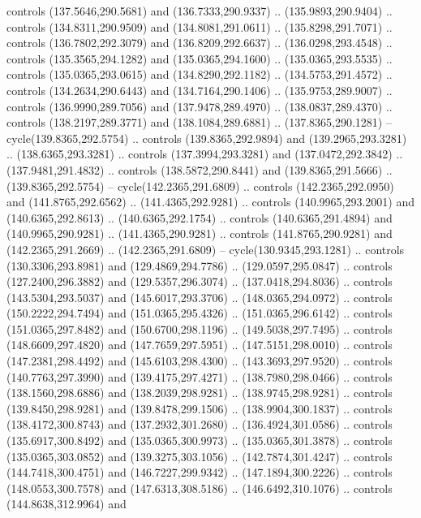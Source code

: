 \begin{scope}[cm={{1.25,0.0,0.0,-1.25,(0.0,743.43331)}}]
    controls (137.5646,290.5681) and (136.7333,290.9337) .. (135.9893,290.9404) ..
    controls (134.8311,290.9509) and (134.8081,291.0611) .. (135.8298,291.7071) ..
    controls (136.7802,292.3079) and (136.8209,292.6637) .. (136.0298,293.4548) ..
    controls (135.3565,294.1282) and (135.0365,294.1600) .. (135.0365,293.5535) ..
    controls (135.0365,293.0615) and (134.8290,292.1182) .. (134.5753,291.4572) ..
    controls (134.2634,290.6443) and (134.7164,290.1406) .. (135.9753,289.9007) ..
    controls (136.9990,289.7056) and (137.9478,289.4970) .. (138.0837,289.4370) ..
    controls (138.2197,289.3771) and (138.1084,289.6881) .. (137.8365,290.1281) --
    cycle(139.8365,292.5754) .. controls (139.8365,292.9894) and
    (139.2965,293.3281) .. (138.6365,293.3281) .. controls (137.3994,293.3281) and
    (137.0472,292.3842) .. (137.9481,291.4832) .. controls (138.5872,290.8441) and
    (139.8365,291.5666) .. (139.8365,292.5754) -- cycle(142.2365,291.6809) ..
    controls (142.2365,292.0950) and (141.8765,292.6562) .. (141.4365,292.9281) ..
    controls (140.9965,293.2001) and (140.6365,292.8613) .. (140.6365,292.1754) ..
    controls (140.6365,291.4894) and (140.9965,290.9281) .. (141.4365,290.9281) ..
    controls (141.8765,290.9281) and (142.2365,291.2669) .. (142.2365,291.6809) --
    cycle(130.9345,293.1281) .. controls (130.3306,293.8981) and
    (129.4869,294.7786) .. (129.0597,295.0847) .. controls (127.2400,296.3882) and
    (129.5357,296.3074) .. (137.0418,294.8036) .. controls (143.5304,293.5037) and
    (145.6017,293.3706) .. (148.0365,294.0972) .. controls (150.2222,294.7494) and
    (151.0365,295.4326) .. (151.0365,296.6142) .. controls (151.0365,297.8482) and
    (150.6700,298.1196) .. (149.5038,297.7495) .. controls (148.6609,297.4820) and
    (147.7659,297.5951) .. (147.5151,298.0010) .. controls (147.2381,298.4492) and
    (145.6103,298.4300) .. (143.3693,297.9520) .. controls (140.7763,297.3990) and
    (139.4175,297.4271) .. (138.7980,298.0466) .. controls (138.1560,298.6886) and
    (138.2039,298.9281) .. (138.9745,298.9281) .. controls (139.8450,298.9281) and
    (139.8478,299.1506) .. (138.9904,300.1837) .. controls (138.4172,300.8743) and
    (137.2932,301.2680) .. (136.4924,301.0586) .. controls (135.6917,300.8492) and
    (135.0365,300.9973) .. (135.0365,301.3878) .. controls (135.0365,303.0852) and
    (139.3275,303.1056) .. (142.7874,301.4247) .. controls (144.7418,300.4751) and
    (146.7227,299.9342) .. (147.1894,300.2226) .. controls (148.0553,300.7578) and
    (147.6313,308.5186) .. (146.6492,310.1076) .. controls (144.8638,312.9964) and

\end{scope}

